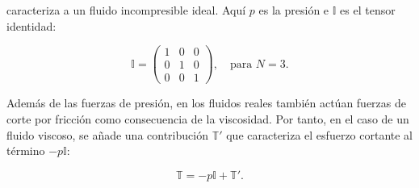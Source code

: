 \documentclass[12pt]{article}
\begin{document}
caracteriza a un fluido incompresible ideal. Aquí $p$ es la presión e $\mathbb{I}$ es el tensor identidad:

\begin{equation}
\mathbb{I} = 
\begin{pmatrix}
1 & 0 & 0 \\
0 & 1 & 0 \\
0 & 0 & 1
\end{pmatrix}, \quad \text{para } N = 3.
\tag{1.1.5}
\end{equation}

Además de las fuerzas de presión, en los fluidos reales también actúan fuerzas de corte por fricción como consecuencia de la viscosidad. Por tanto, en el caso de un fluido viscoso, se añade una contribución $\mathbb{T}'$ que caracteriza el esfuerzo cortante al término $-p\mathbb{I}$:

\begin{equation}
\mathbb{T} = -p\mathbb{I} + \mathbb{T}'.
\tag{1.1.6}
\end{equation}
\end{document}
